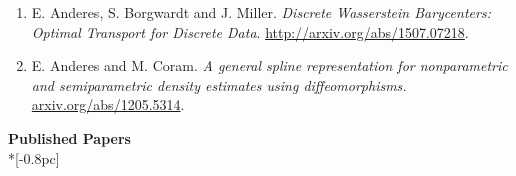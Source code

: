 \documentclass[11pt]{article}
\newcommand{\head}[1]{
  \vspace{10pt}
  {\Large \bf #1} \\*[-0.8pc]
  \underline{\hspace{6.07in}}}
\begin{document}
\begin{enumerate}[labelindent=0pt]


\item
E. Anderes, S. Borgwardt and J. Miller. \textsl{Discrete Wasserstein Barycenters: Optimal Transport for Discrete Data}.
\url{http://arxiv.org/abs/1507.07218}.



\item
E. Anderes and M. Coram.  \textsl{A general spline representation for nonparametric and semiparametric density estimates using diffeomorphisms.}  \url{arxiv.org/abs/1205.5314}.

\end{enumerate}




\head{Published Papers}%

 \vspace{.1mm}
\end{document}

